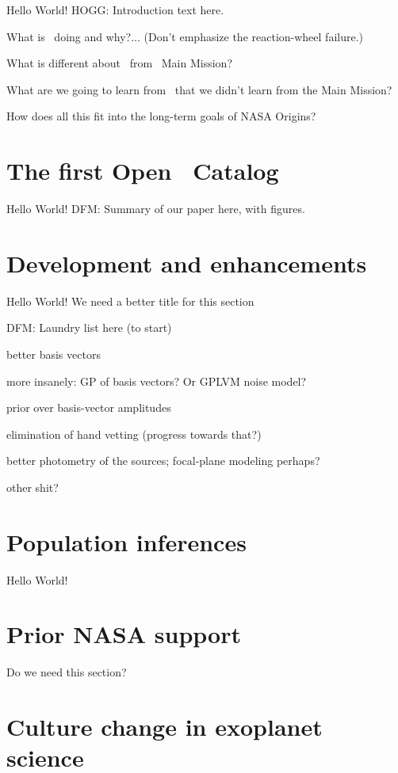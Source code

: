 \documentclass[12pt]{article}
\begin{document}
Hello World!  HOGG:  Introduction text here.

What is \ketu\ doing and why?... (Don't emphasize the reaction-wheel failure.)

What is different about \ketu\ from \kepler\ Main Mission?

What are we going to learn from \ketu\ that we didn't learn from the Main Mission?

How does all this fit into the long-term goals of NASA Origins?

\section{The first Open \ketu\ Catalog}

Hello World!  DFM:  Summary of our paper here, with figures.

\section{Development and enhancements}

Hello World!  We need a better title for this section

DFM:  Laundry list here (to start)

better basis vectors

more insanely: GP of basis vectors?  Or GPLVM noise model?

prior over basis-vector amplitudes

elimination of hand vetting (progress towards that?)

better photometry of the sources; focal-plane modeling perhaps?

other shit?

\section{Population inferences}

Hello World!

\section{Prior NASA support}

Do we need this section?

\section{Culture change in exoplanet science}
\end{document}
